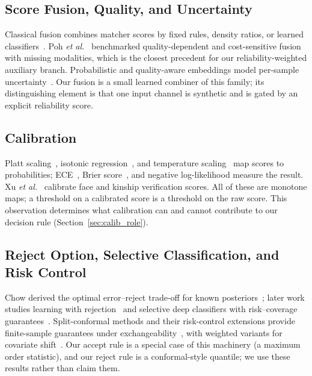 \documentclass[journal]{IEEEtran}
\begin{document}
\subsection{Score Fusion, Quality, and Uncertainty}
Classical fusion combines matcher scores by fixed rules, density ratios, or learned classifiers~\cite{kittler1998combining,ross2003fusion,nandakumar2008lr}. Poh \emph{et al.}~\cite{poh2009quality} benchmarked quality-dependent and cost-sensitive fusion with missing modalities, which is the closest precedent for our reliability-weighted auxiliary branch. Probabilistic and quality-aware embeddings model per-sample uncertainty~\cite{shi2019pfe,meng2021magface,kim2022adaface,ahn2024ucface}. Our fusion is a small learned combiner of this family; its distinguishing element is that one input channel is synthetic and is gated by an explicit reliability score.

\subsection{Calibration}
Platt scaling~\cite{platt1999}, isotonic regression~\cite{zadrozny2002isotonic}, and temperature scaling~\cite{guo2017calibration} map scores to probabilities; ECE~\cite{naeini2015ece}, Brier score~\cite{brier1950}, and negative log-likelihood measure the result. Xu \emph{et al.}~\cite{xu2024asc} calibrate face and kinship verification scores. All of these are monotone maps; a threshold on a calibrated score is a threshold on the raw score. This observation determines what calibration can and cannot contribute to our decision rule (Section~\ref{sec:calib_role}).

\subsection{Reject Option, Selective Classification, and Risk Control}
Chow derived the optimal error--reject trade-off for known posteriors~\cite{chow1970reject}; later work studies learning with rejection~\cite{herbei2006reject} and selective deep classifiers with risk--coverage guarantees~\cite{elyaniv2010selective,geifman2017selective}. Split-conformal methods and their risk-control extensions provide finite-sample guarantees under exchangeability~\cite{vovk2005alrw,angelopoulos2024crc,angelopoulos2021ltt}, with weighted variants for covariate shift~\cite{tibshirani2019covshift}. Our accept rule is a special case of this machinery (a maximum order statistic), and our reject rule is a conformal-style quantile; we use these results rather than claim them.
\end{document}
